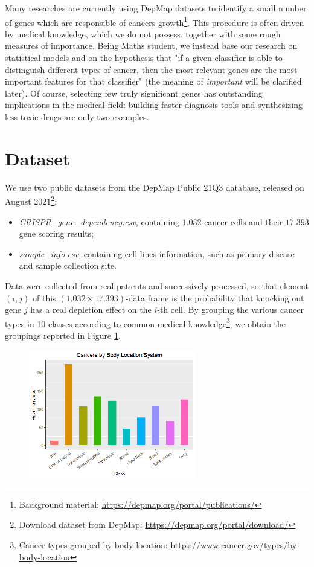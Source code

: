 \documentclass[a4paper,11pt, oneside]{article}  %
\begin{document}
Many researches are currently using DepMap datasets to identify a small number of genes which are responsible of cancers growth\footnote{Background material: \url{https://depmap.org/portal/publications/}}. This procedure is often driven by medical knowledge,  which we do not possess,  together with some rough measures of importance.  Being Maths student, we instead base our research on statistical models and on the hypothesis that "if a given classifier is able to distinguish different types of cancer,  then the most relevant genes are the most important features for that classifier" (the meaning of \textit{important} will be clarified later).  Of course,  selecting few truly significant genes has outstanding implications in the medical field: building faster diagnosis tools and synthesizing less toxic drugs are only two examples. 


\section{Dataset}
We use two public datasets from the DepMap Public 21Q3 database,  released on August 2021\footnote{Download dataset from DepMap:  \url{https://depmap.org/portal/download/}}:
\begin{itemize}
	\item \textit{CRISPR\_gene\_dependency.csv}, containing $1.032$ cancer cells and their $17.393$ gene scoring results;
	\item \textit{sample\_info.csv}, containing cell lines information,  such as primary disease and sample collection site.
\end{itemize}
Data were collected from real patients and successively processed,  so that element $(i, j)$ of this $(1.032 \times 17.393)$-data frame is the probability that knocking out gene $j$ has a real depletion effect on the $i$-th cell.
By grouping the various cancer types in 10 classes according to common medical knowledge\footnote{Cancer types grouped by body location: \url{https://www.cancer.gov/types/by-body-location}},  we obtain the groupings reported in Figure \ref{fig1}. 

\begin{figure}
	\includegraphics[width=0.65\textwidth]{plot1.png}
	\label{fig1}
\end{figure}
\end{document}
